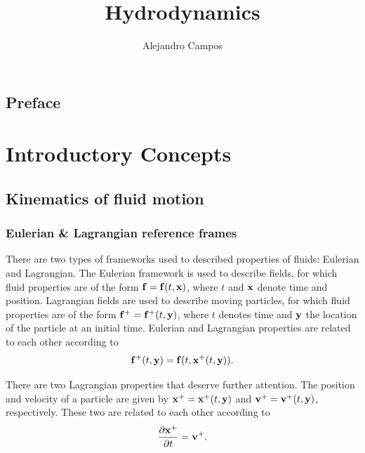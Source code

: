 \documentclass[oneside,a4paper,11pt]{report}
\title{Hydrodynamics}
\author{Alejandro Campos}
\begin{document}
\maketitle
\tableofcontents

\chapter*{Preface}

\part{Introductory Concepts}

\chapter{Kinematics of fluid motion}

\section{Eulerian \& Lagrangian reference frames}
There are two types of frameworks used to described properties of fluids: Eulerian and Lagrangian. The Eulerian framework is used to describe fields, for which fluid properties are of the form $\mathbf{f} = \mathbf{f}(t,\mathbf{x})$, where $t$ and $\mathbf{x}$ denote time and position. Lagrangian fields are used to describe moving particles, for which fluid properties are of the form $\mathbf{f}^+ = \mathbf{f}^+(t,\mathbf{y})$, where $t$ denotes time and $\mathbf{y}$ the location of the particle at an initial time. Eulerian and Lagrangian properties are related to each other according to 
\begin{equation}
\mathbf{f}^+(t,\mathbf{y})=\mathbf{f}(t,\mathbf{x}^+(t,\mathbf{y})).
\end{equation}

There are two Lagrangian properties that deserve further attention. The position and velocity of a particle are given by $\mathbf{x}^+ = \mathbf{x}^+(t,\mathbf{y})$ and $\mathbf{v}^+ = \mathbf{v}^+(t,\mathbf{y})$, respectively. These two are related to each other according to 
\begin{equation}
\frac{\partial \mathbf{x}^+}{\partial t} = \mathbf{v}^+.
\end{equation}
\end{document}
